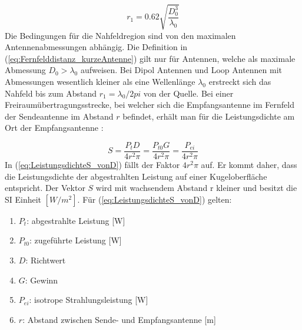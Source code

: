 \begin{equation}
r_{1}=0.62\sqrt{\dfrac{D_{0}^{3}}{\lambda_{0}}} \label{eq:Fernfelddistanz_kurzeAntenne}
\end{equation}
Die Bedingungen für die Nahfeldregion sind von den maximalen Antennenabmessungen abhängig. Die Definition in (\ref{eq:Fernfelddistanz_kurzeAntenne}) gilt nur für Antennen, welche als maximale Abmessung $D_{0}>\lambda_{0}$ aufweisen.
Bei Dipol Antennen und Loop Antennen mit Abmessungen wesentlich kleiner als eine Wellenlänge $\lambda_{0}$ erstreckt sich das Nahfeld bis zum Abstand $r_{1}=\lambda_{0}/2pi$ von der Quelle. Bei einer Freiraumübertragungsstrecke, bei welcher sich die Empfangsantenne im Fernfeld der Sendeantenne im Abstand $r$ befindet, erhält man für die Leistungsdichte am Ort der Empfangsantenne \cite{meinke1992taschenbuch}:

\begin{equation}
S=\dfrac{P_{t}D}{4r^{2}\pi} = \dfrac{P_{t0}G}{4r^{2}\pi}=\dfrac{P_{ei}}{4r^{2}\pi}\label{eq:LeistungsdichteS_vonD}
\end{equation}
In (\ref{eq:LeistungsdichteS_vonD}) fällt der Faktor $4r^{2}\pi$ auf. Er kommt daher, dass die Leistungsdichte der abgestrahlten Leistung auf einer Kugeloberfläche entspricht. Der Vektor $S$ wird mit wachsendem Abstand r kleiner und besitzt die SI Einheit $[W/m^{2}]$. Für (\ref {eq:LeistungsdichteS_vonD}) gelten:
\begin{enumerate}[leftmargin=2cm]
  \item[] $P_t$: abgestrahlte Leistung [W]
  \item[] $P_{t0}$: zugeführte Leistung [W]
	\item[] $D$: Richtwert 
  \item[] $G$: Gewinn 
  \item[] $P_{ei}$: isotrope Strahlungsleistung [W] 
  \item[] $r$: Abstand zwischen Sende- und Empfangsantenne [m]
\end{enumerate} 





